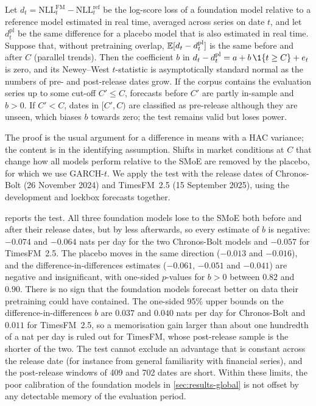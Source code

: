 \begin{proposition}\label{prop:release}
Let $d_t=\mathrm{NLL}^{\mathrm{FM}}_t-\mathrm{NLL}^{\mathrm{ref}}_t$ be the log-score loss of a
foundation model relative to a reference model estimated in real time, averaged across series on date
$t$, and let $d^{\mathrm{pl}}_t$ be the same difference for a placebo model that is also estimated in
real time. Suppose that, without pretraining overlap, $\mathbb{E}[d_t-d^{\mathrm{pl}}_t]$ is the same before
and after $C$ (parallel trends). Then the coefficient $b$ in
$d_t-d^{\mathrm{pl}}_t=a+b\,\1\{t\ge C\}+e_t$ is zero, and its Newey--West $t$-statistic is
asymptotically standard normal as the numbers of pre- and post-release dates grow. If the corpus
contains the evaluation series up to some cut-off $C'\le C$, forecasts before $C'$ are partly
in-sample and $b>0$. If $C'<C$, dates in $[C',C)$ are classified as pre-release although they are
unseen, which biases $b$ towards zero; the test remains valid but loses power.
\end{proposition}

\noindent The proof is the usual argument for a difference in means with a HAC variance; the content
is in the identifying assumption. Shifts in market conditions at $C$ that change how all models
perform relative to the SMoE are removed by the placebo, for which we use GARCH-$t$. We apply the test
with the release dates of Chronos-Bolt (26 November 2024) and TimesFM~2.5 (15 September 2025), using
the development and lockbox forecasts together.

 reports the test. All three foundation models lose to the SMoE both before and
after their release dates, but by less afterwards, so every estimate of $b$ is negative: $-0.074$ and
$-0.064$ nats per day for the two Chronos-Bolt models and $-0.057$ for TimesFM~2.5. The placebo moves
in the same direction ($-0.013$ and $-0.016$), and the difference-in-differences estimates
($-0.061$, $-0.051$ and $-0.041$) are negative and insignificant, with one-sided $p$-values for
$b>0$ between $0.82$ and $0.90$. There is no sign that the foundation models forecast better on data
their pretraining could have contained. The one-sided 95\% upper bounds on the difference-in-differences
$b$ are $0.037$ and $0.040$
nats per day for Chronos-Bolt and $0.011$ for TimesFM~2.5, so a memorisation gain larger than about
one hundredth of a nat per day is ruled out for TimesFM, whose post-release sample is the shorter of the
two. The test cannot exclude an advantage that is constant across the release date (for instance from
general familiarity with financial series), and the post-release windows of 409 and 702 dates are
short. Within these limits, the poor calibration of the foundation models in
\cref{sec:results-global} is not offset by any detectable memory of the evaluation period.


